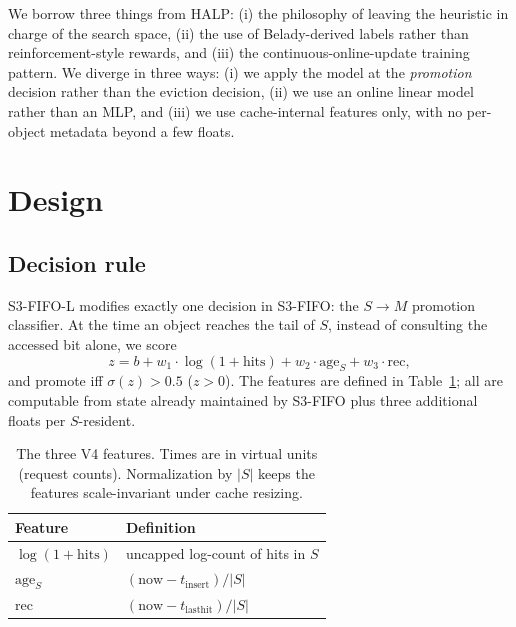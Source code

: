 \documentclass[letterpaper,twocolumn,10pt]{article}
\begin{document}
We borrow three things from HALP: (i) the philosophy of leaving
the heuristic in charge of the search space, (ii) the use of
Belady-derived labels rather than reinforcement-style rewards,
and (iii) the continuous-online-update training pattern.
We diverge in three ways: (i) we apply the model at the
\emph{promotion} decision rather than the eviction decision, (ii)
we use an online linear model rather than an MLP, and (iii) we
use cache-internal features only, with no per-object metadata
beyond a few floats.
 
\section{Design}
\label{sec:design}
 
\subsection{Decision rule}
 
S3-FIFO-L modifies exactly one decision in S3-FIFO: the $S\to M$
promotion classifier. At the time an object reaches the tail of
$S$, instead of consulting the accessed bit alone, we score
\begin{equation*}
z = b + w_1\!\cdot\!\log(1+\textrm{hits}) + w_2\!\cdot\!\textrm{age}_S + w_3\!\cdot\!\textrm{rec},
\end{equation*}
and promote iff $\sigma(z) > 0.5$ ($z > 0$). The features are
defined in Table~\ref{tab:features}; all are computable from
state already maintained by S3-FIFO plus three additional floats
per $S$-resident.
 
\begin{table}[t]
\small
\begin{tabular}{ll}
\toprule
Feature & Definition \\
\midrule
$\log(1+\textrm{hits})$ & uncapped log-count of hits in $S$ \\
$\textrm{age}_S$ & $(\textrm{now} - t_{\text{insert}}) / |S|$ \\
$\textrm{rec}$ & $(\textrm{now} - t_{\text{lasthit}}) / |S|$ \\
\bottomrule
\end{tabular}
\caption{The three V4 features. Times are in virtual units (request
counts). Normalization by $|S|$ keeps the features
scale-invariant under cache resizing.}
\label{tab:features}
\end{table}
 
\end{document}

